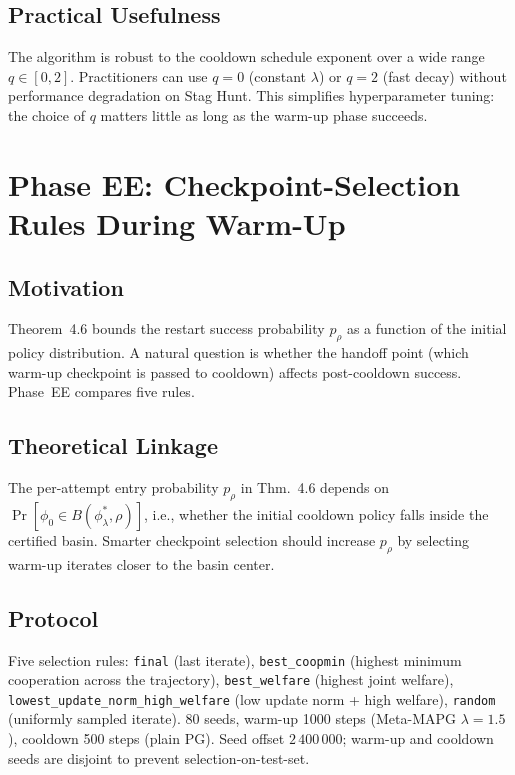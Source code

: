 \documentclass[11pt,a4paper]{article}
\begin{document}
\subsection{Practical Usefulness}

The algorithm is robust to the cooldown schedule exponent over a wide range
$q\in[0,2]$. Practitioners can use $q=0$ (constant $\lambda$) or $q=2$
(fast decay) without performance degradation on Stag Hunt. This simplifies
hyperparameter tuning: the choice of $q$ matters little as long as the
warm-up phase succeeds.

\section{Phase EE: Checkpoint-Selection Rules During Warm-Up}
\label{sec:ee}

\subsection{Motivation}

Theorem~4.6 bounds the restart success probability $p_\rho$ as a function
of the initial policy distribution. A natural question is whether the
handoff point (which warm-up checkpoint is passed to cooldown) affects
post-cooldown success. Phase~EE compares five rules.

\subsection{Theoretical Linkage}

The per-attempt entry probability $p_\rho$ in Thm.~4.6 depends on
$\Pr[\phi_0 \in B(\phi^*_\lambda,\rho)]$, i.e., whether the initial
cooldown policy falls inside the certified basin. Smarter checkpoint
selection should increase $p_\rho$ by selecting warm-up iterates
closer to the basin center.

\subsection{Protocol}

Five selection rules: \texttt{final} (last iterate), \texttt{best\_coopmin}
(highest minimum cooperation across the trajectory), \texttt{best\_welfare}
(highest joint welfare), \texttt{lowest\_update\_norm\_high\_welfare}
(low update norm + high welfare), \texttt{random} (uniformly sampled
iterate). 80 seeds, warm-up 1000 steps (Meta-MAPG $\lambda=1.5$),
cooldown 500 steps (plain PG). Seed offset $2\,400\,000$; warm-up and
cooldown seeds are disjoint to prevent selection-on-test-set.
\end{document}
